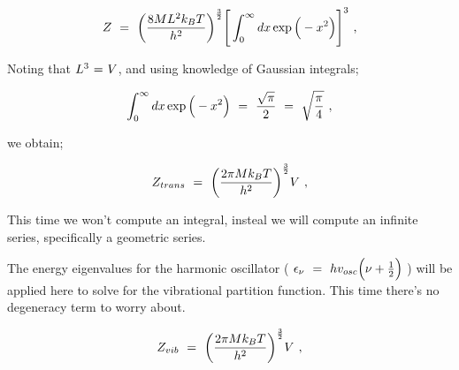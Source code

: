 \documentclass{article}
\newcounter{subsubsubsection}[subsubsection]
\begin{document}
\begin{equation} \label{eb-eq-256-105}
Z \hspace{0.125cm} = \hspace{0.125cm} \bigg( \frac{8 M L^2 k_B T}{h^2} \bigg)^{\frac{3}{2}} \Bigg[ \int_{0}^{\infty} d x \exp{\Big(-x^2 \Big)} \Bigg]^3 \hspace{0.125cm} ,
\end{equation}

Noting that \begin{math} L^3 \hspace{0.025cm} = \hspace{0.025cm} V \end{math}, and using knowledge of Gaussian integrals;

\begin{equation} \label{eb-eq-256-106}
\int_{0}^{\infty} d x \exp{\Big(-x^2 \Big)} \hspace{0.125cm} = \hspace{0.125cm} \frac{\sqrt{\pi}}{2} \hspace{0.125cm} = \hspace{0.125cm} \sqrt{\frac{\pi}{4}} \hspace{0.125cm} ,
\end{equation}

we obtain;

\begin{equation} \label{eb-eq-256-107}
Z_{trans} \hspace{0.125cm} = \hspace{0.125cm} \bigg( \frac{2 \pi M k_B T}{h^2} \bigg)^{\frac{3}{2}} V \hspace{0.125cm} ,
\end{equation}

This time we won't compute an integral, insteal we will compute an infinite series, specifically a geometric series. 

The energy eigenvalues for the harmonic oscillator ( \begin{math} \epsilon_{\nu} \hspace{0.125cm} = \hspace{0.125cm} h v_{osc} \Big( \nu + \frac{1}{2} \Big) \end{math} ) will be applied here to solve for the vibrational partition function. This time there's no degeneracy term to worry about.

\begin{equation} \label{eb-eq-256-108}
Z_{vib} \hspace{0.125cm} = \hspace{0.125cm} \bigg( \frac{2 \pi M k_B T}{h^2} \bigg)^{\frac{3}{2}} V \hspace{0.125cm} ,
\end{equation}
\end{document}
